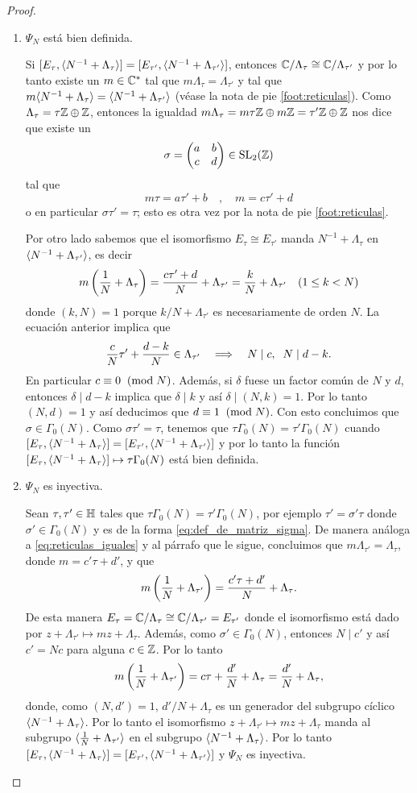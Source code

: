 \begin{proof}
\begin{enumerate}[label=\emph{\roman*})]
  \item $\Psi_N$ está bien definida.
  
  \-\;\;Si $[E_\tau,\langle N^{-1}+\Lambda_\tau \rangle]=[E_{\tau'},\langle N^{-1}+\Lambda_{\tau'} \rangle]$, entonces $\mathbb{C}/\Lambda_\tau\cong\mathbb{C}/\Lambda_{\tau'}$ y por lo tanto existe un $m\in\mathbb{C}^*$ tal que $m\Lambda_\tau=\Lambda_{\tau'}$ y tal que $m\langle N^{-1}+\Lambda_\tau \rangle=\langle N^{-1}+\Lambda_{\tau'} \rangle$ (véase la nota de pie \ref{foot:reticulas}). Como $\Lambda_\tau=\tau\mathbb{Z}\oplus\mathbb{Z}$, entonces la igualdad $m\Lambda_\tau=m\tau\mathbb{Z}\oplus m\mathbb{Z}=\tau'\mathbb{Z}\oplus\mathbb{Z}$ nos dice que existe un
\[
	\sigma=\begin{pmatrix}a & b\\ c & d\end{pmatrix}\in\mathrm{SL}_2(\mathbb{Z})
\]
tal que
\[
	m\tau=a\tau'+b\quad,\quad m=c\tau'+d
\]
o en particular $\sigma\tau'=\tau$; esto es otra vez por la nota de pie \ref{foot:reticulas}.

  \-\;\; Por otro lado sabemos que el isomorfismo $E_\tau\cong E_{\tau'}$ manda $N^{-1}+\Lambda_\tau$ en $\langle N^{-1}+\Lambda_{\tau'} \rangle$, es decir
\[
	m\left( \frac{1}{N}+\Lambda_\tau \right)=\frac{c\tau'+d}{N}+\Lambda_{\tau'}=\frac{k}{N}+\Lambda_{\tau'}\quad (1\leq k< N)
\]
donde $(k,N)=1$ porque $k/N+\Lambda_{\tau'}$ es necesariamente de orden $N$. La ecuación anterior implica que
\[
	\frac{c}{N}\tau'+\frac{d-k}{N}\in\Lambda_{\tau'}\quad\Longrightarrow\quad N\mid c,\;\; N\mid d-k.
\]
En particular $c\equiv0\;\;(\mathrm{mod}\; N)$. Adem\'as, si $\delta$ fuese un factor común de $N$ y $d$, entonces $\delta\mid d-k$ implica que $\delta\mid k$ y así $\delta\mid(N,k)=1$. Por lo tanto $(N,d)=1$ y así deducimos que $d\equiv1\;\;(\mathrm{mod}\; N)$. Con esto concluimos que $\sigma\in\Gamma_0(N)$. Como $\sigma\tau'=\tau$, tenemos que $\tau\Gamma_0(N)=\tau'\Gamma_0(N)$ cuando $[E_\tau,\langle N^{-1}+\Lambda_\tau \rangle]=[E_{\tau'},\langle N^{-1}+\Lambda_{\tau'} \rangle]$ y por lo tanto la función $[E_\tau,\langle N^{-1}+\Lambda_\tau \rangle]\mapsto\tau\Gamma_0(N)$ está bien definida.

  \item $\Psi_N$ es inyectiva.
  
  \-\;\; Sean $\tau,\tau'\in\mathbb{H}$ tales que $\tau\Gamma_0(N)=\tau'\Gamma_0(N)$, por ejemplo $\tau'=\sigma'\tau$ donde $\sigma'\in\Gamma_0(N)$ y es de la forma \eqref{eq:def_de_matriz_sigma}. De manera análoga a \eqref{eq:reticulas_iguales} y al párrafo que le sigue, concluimos que $m\Lambda_{\tau'}=\Lambda_{\tau}$, donde $m=c'\tau+d'$, y que
  \[
  	m\left( \frac{1}{N}+\Lambda_{\tau'} \right)=\frac{c'\tau+d'}{N}+\Lambda_\tau.
  \]
De esta manera $E_\tau=\mathbb{C}/\Lambda_\tau\cong\mathbb{C}/\Lambda_{\tau'}=E_{\tau'}$ donde el isomorfismo está dado por $z+\Lambda_{\tau'}\mapsto mz+\Lambda_{\tau}$. Además, como $\sigma'\in\Gamma_0(N)$, entonces $N\mid c'$ y así $c'=Nc$ para alguna $c\in\mathbb{Z}$. Por lo tanto
\[
  m\left( \frac{1}{N}+\Lambda_{\tau'} \right)=c\tau+\frac{d'}{N}+\Lambda_\tau=\frac{d'}{N}+\Lambda_\tau,
\]
donde, como $(N,d')=1$, $d'/N+\Lambda_\tau$ es un generador del subgrupo cíclico $\langle N^{-1}+\Lambda_\tau \rangle$. Por lo tanto el isomorfismo $z+\Lambda_{\tau'}\mapsto mz+\Lambda_{\tau}$ manda al subgrupo $\langle \frac{1}{N}+\Lambda_{\tau'} \rangle$ en el subgrupo $\langle N^{-1}+\Lambda_\tau \rangle$. Por lo tanto $[E_\tau,\langle N^{-1}+\Lambda_\tau \rangle]=[E_{\tau'},\langle N^{-1}+\Lambda_{\tau'} \rangle]$ y $\Psi_N$ es inyectiva.


\end{enumerate}
\end{proof}
